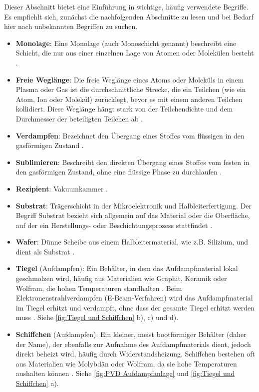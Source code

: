 \documentclass{article} %
\begin{document}
Dieser Abschnitt bietet eine Einführung in wichtige, häufig verwendete Begriffe. Es empfiehlt sich, zunächst die nachfolgenden Abschnitte zu lesen und bei Bedarf hier nach unbekannten Begriffen zu suchen.

\begin{itemize}
    \item \textbf{Monolage}: Eine Monolage (auch Monoschicht genannt) beschreibt eine Schicht, die nur aus einer einzelnen Lage von Atomen oder Molekülen besteht \cite{kittel2004}.
    \item \textbf{Freie Weglänge}: Die freie Weglänge eines Atoms oder Moleküls in einem Plasma oder Gas ist die durchschnittliche Strecke, die ein Teilchen (wie ein Atom, Ion oder Molekül) zurücklegt, bevor es mit einem anderen Teilchen kollidiert. Diese Weglänge hängt stark von der Teilchendichte und dem Durchmesser der beteiligten Teilchen ab \cite{kittel2004}.
    \item \textbf{Verdampfen}: Bezeichnet den Übergang eines Stoffes vom flüssigen in den gasförmigen Zustand \cite{kittel2004}.
    \item \textbf{Sublimieren}: Beschreibt den direkten Übergang eines Stoffes vom festen in den gasförmigen Zustand, ohne eine flüssige Phase zu durchlaufen \cite{kittel2004}.
    \item \textbf{Rezipient}: Vakuumkammer \cite{keplinger2024, ohring2002}.
    \item \textbf{Substrat}: Trägerschicht in der Mikroelektronik und Halbleiterfertigung. Der Begriff Substrat bezieht sich allgemein auf das Material oder die Oberfläche, auf der ein Herstellungs- oder Beschichtungsprozess stattfindet \cite{ohring2002}.
    \item \textbf{Wafer}: Dünne Scheibe aus einem Halbleitermaterial, wie z.B. Silizium, und dient als Substrat \cite{sze2006}.
    \item \textbf{Tiegel} (Aufdampfen): Ein Behälter, in dem das Aufdampfmaterial lokal geschmolzen wird, häufig aus Materialien wie Graphit, Keramik oder Wolfram, die hohen Temperaturen standhalten \cite{smith1995, ohring2002}. Beim Elektronenstrahlverdampfen (E-Beam-Verfahren) wird das Aufdampfmaterial im Tiegel erhitzt und verdampft, ohne dass der gesamte Tiegel erhitzt werden muss \cite{smith1995}. Siehe \autoref{fig:Tiegel und Schiffchen} b), c) und d).
    \item \textbf{Schiffchen} (Aufdampfen): Ein kleiner, meist bootförmiger Behälter (daher der Name), der ebenfalls zur Aufnahme des Aufdampfmaterials dient, jedoch direkt beheizt wird, häufig durch Widerstandsheizung. Schiffchen bestehen oft aus Materialien wie Molybdän oder Wolfram, da sie hohe Temperaturen aushalten können \cite{mattox2010handbook, ohring2002}. Siehe \autoref{fig:PVD Aufdampfanlage} und \autoref{fig:Tiegel und Schiffchen} a).

\end{itemize}
\end{document}
